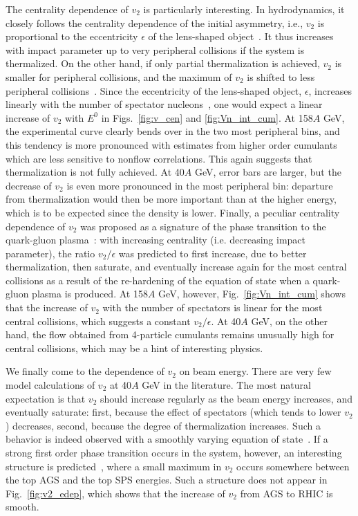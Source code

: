 \documentclass[aps,prc,superscriptaddress,showpacs,floatfix,nofootinbib]{revtex4}
\begin{document}
The centrality dependence of $v_2$ is particularly interesting.  In
hydrodynamics, it closely follows the centrality dependence of the
initial asymmetry, i.e., $v_2$ is proportional to the eccentricity
$\epsilon$ of the lens-shaped object~\cite{OL92}.  It thus increases
with impact parameter up to very peripheral collisions if the system
is thermalized.  On the other hand, if only partial thermalization is
achieved, $v_2$ is smaller for peripheral collisions, and the maximum
of $v_2$ is shifted to less peripheral
collisions~\cite{Kolb:2000fh,Voloshin:1999gs}.  Since the eccentricity
of the lens-shaped object, $\epsilon$, increases linearly with the
number of spectator nucleons~\cite{OL92}, one would expect a linear
increase of $v_2$ with $E^0$ in Figs.~\ref{fig:v_cen} and
\ref{fig:Vn_int_cum}.  At 158$A$ GeV, the experimental curve
clearly bends over in the two most peripheral bins, and this tendency
is more pronounced with estimates from higher order cumulants which
are less sensitive to nonflow correlations.  This again suggests that
thermalization is not fully achieved.  At 40$A$ GeV, error bars are
larger, but the decrease of $v_2$ is even more pronounced in the most
peripheral bin: departure from thermalization would then be more
important than at the higher energy, which is to be expected since the
density is lower.  Finally, a peculiar centrality dependence of $v_2$
was proposed as a signature of the phase transition to the quark-gluon
plasma~\cite{Sorge:1998mk}: with increasing centrality
(i.e. decreasing impact parameter), the ratio $v_2/\epsilon$ was
predicted to first increase, due to better thermalization, then
saturate, and eventually increase again for the most central
collisions as a result of the re-hardening of the equation of state
when a quark-gluon plasma is produced.  At 158$A$ GeV, however,
Fig.~\ref{fig:Vn_int_cum} shows that the increase of $v_2$ with the
number of spectators is linear for the most central collisions, which
suggests a constant $v_2/\epsilon$. At 40$A$ GeV, on the other hand,
the flow obtained from 4-particle cumulants remains unusually high for
central collisions, which may be a hint of interesting physics.

We finally come to the dependence of $v_2$ on beam energy.  There are
very few model calculations of $v_2$ at 40$A$ GeV in the
literature.  The most natural expectation is that $v_2$ should
increase regularly as the beam energy increases, and eventually
saturate: first, because the effect of spectators (which tends to
lower $v_2$) decreases, second, because the degree of thermalization
increases.  Such a behavior is indeed observed with a smoothly varying
equation of state~\cite{Kolb:99}. If a strong first order phase
transition occurs in the system, however, an interesting structure is
predicted~\cite{Kolb:99}, where a small maximum in $v_2$ occurs
somewhere between the top AGS and the top SPS energies.  Such a
structure does not appear in Fig.~\ref{fig:v2_edep}, which shows that
the increase of $v_2$ from AGS to RHIC is smooth.
\end{document}
